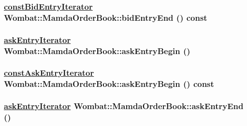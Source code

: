 \hypertarget{classWombat_1_1MamdaOrderBook_382d2a24e1ea06d23b668b42f71a4ca0}{
\subsubsection[bidEntryEnd]{\setlength{\rightskip}{0pt plus 5cm}\hyperlink{classWombat_1_1MamdaOrderBook_1_1bidEntryIterator}{const\-Bid\-Entry\-Iterator} Wombat::Mamda\-Order\-Book::bid\-Entry\-End () const}}
\label{classWombat_1_1MamdaOrderBook_382d2a24e1ea06d23b668b42f71a4ca0}


\hypertarget{classWombat_1_1MamdaOrderBook_1a19f53739ca3873b45b0e3d32f1a318}{
\subsubsection[askEntryBegin]{\setlength{\rightskip}{0pt plus 5cm}\hyperlink{classWombat_1_1MamdaOrderBook_1_1askEntryIterator}{ask\-Entry\-Iterator} Wombat::Mamda\-Order\-Book::ask\-Entry\-Begin ()}}
\label{classWombat_1_1MamdaOrderBook_1a19f53739ca3873b45b0e3d32f1a318}


\hypertarget{classWombat_1_1MamdaOrderBook_e4a92934786bd1dbde7e8d1f8c78aa79}{
\subsubsection[askEntryBegin]{\setlength{\rightskip}{0pt plus 5cm}\hyperlink{classWombat_1_1MamdaOrderBook_1_1askEntryIterator}{const\-Ask\-Entry\-Iterator} Wombat::Mamda\-Order\-Book::ask\-Entry\-Begin () const}}
\label{classWombat_1_1MamdaOrderBook_e4a92934786bd1dbde7e8d1f8c78aa79}


\hypertarget{classWombat_1_1MamdaOrderBook_118d2f41641f35259a0f0fad815426e9}{
\subsubsection[askEntryEnd]{\setlength{\rightskip}{0pt plus 5cm}\hyperlink{classWombat_1_1MamdaOrderBook_1_1askEntryIterator}{ask\-Entry\-Iterator} Wombat::Mamda\-Order\-Book::ask\-Entry\-End ()}}
\label{classWombat_1_1MamdaOrderBook_118d2f41641f35259a0f0fad815426e9}


